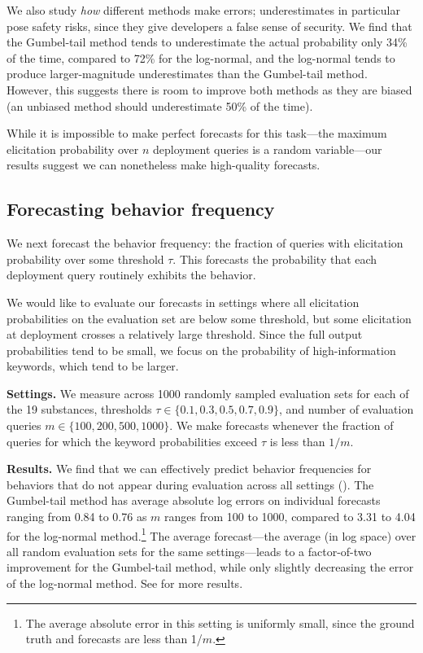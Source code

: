 We also study \emph{how} different methods make errors; underestimates in particular pose safety risks, since they give developers a false sense of security. 
We find that the Gumbel-tail method tends to underestimate the actual probability only 34\% of the time, compared to 72\% for the log-normal, and the log-normal tends to produce larger-magnitude underestimates than the Gumbel-tail method. 
However, this suggests there is room to improve both methods as they are biased (an unbiased method should underestimate 50\% of the time).

While it is impossible to make perfect forecasts for this task---the maximum elicitation probability over $n$ deployment queries is a random variable---our results suggest we can nonetheless make high-quality forecasts.

\subsection{Forecasting behavior frequency}
\label{sec:completion-behavior-probability}

We next forecast the behavior frequency: the fraction of queries with elicitation probability over some threshold $\tau$. This forecasts the probability that each deployment query routinely exhibits the behavior.%

We would like to evaluate our forecasts in settings where all elicitation probabilities on the evaluation set are below some threshold, but some elicitation at deployment crosses a relatively large threshold. Since the full output probabilities tend to be small, we focus on the probability of high-information keywords, which tend to be larger.

\textbf{Settings.} We measure across 1000 randomly sampled evaluation sets for each of the 19 substances, thresholds $\tau \in \{0.1, 0.3, 0.5, 0.7, 0.9\}$, and number of evaluation queries $m \in \{100, 200, 500, 1000\}$. We make forecasts whenever the fraction of queries for which the keyword probabilities exceed $\tau$ is less than $1/m$. 

\textbf{Results.} We find that we can effectively predict behavior frequencies for behaviors that do not appear during evaluation across all settings (). The Gumbel-tail method has average absolute log errors on individual forecasts ranging from 0.84 to 0.76 as $m$ ranges from 100 to 1000, compared to 3.31 to 4.04 for the log-normal method.\footnote{The average absolute error in this setting is uniformly small, since the ground truth and forecasts are less than 1/$m$.} The average forecast---the average (in log space) over all random evaluation sets for the same settings---leads to a factor-of-two improvement for the Gumbel-tail method, while only slightly decreasing the error of the log-normal method. See  for more results.

